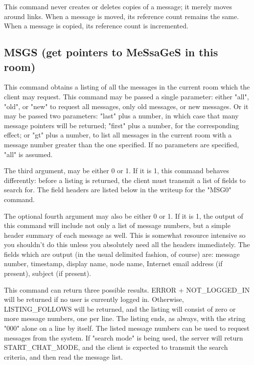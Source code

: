  This command never creates or deletes copies of a message; it merely moves
around links.  When a message is moved, its reference count remains the same.
When a message is copied, its reference count is incremented.




\subsection{MSGS (get pointers to MeSsaGeS in this room)}

 This command obtains a listing of all the messages in the current room
which the client may request.  This command may be passed a single parameter:
either "all", "old", or "new" to request all messages, only old messages, or
new messages.  Or it may be passed two parameters: "last" plus a number, in
which case that many message pointers will be returned; "first" plus a
number, for the corresponding effect; or "gt" plus a number, to list all
messages in the current room with a message number greater than the one
specified.  If no parameters are specified, "all" is assumed.

 The third argument, may be either 0 or 1.  If it is 1, this command behaves
differently: before a listing is returned, the client must transmit a list
of fields to search for.  The field headers are listed below in the writeup
for the "MSG0" command.

 The optional fourth argument may also be either 0 or 1.  If it is 1, the
output of this command will include not only a list of message numbers, but
a simple header summary of each message as well.  This is somewhat resource
intensive so you shouldn't do this unless you absolutely need all the headers
immediately.  The fields which are output (in the usual delimited fashion, of
course) are: message number, timestamp, display name, node name, Internet
email address (if present), subject (if present).

 This command can return three possible results.  ERROR + NOT_LOGGED_IN will
be returned if no user is currently logged in.  Otherwise, LISTING_FOLLOWS
will be returned, and the listing will consist of zero or more message
numbers, one per line.  The listing ends, as always, with the string "000"
alone on a line by itself.  The listed message numbers can be used to request
messages from the system.  If "search mode" is being used, the server will
return START_CHAT_MODE, and the client is expected to transmit the search
criteria, and then read the message list.

